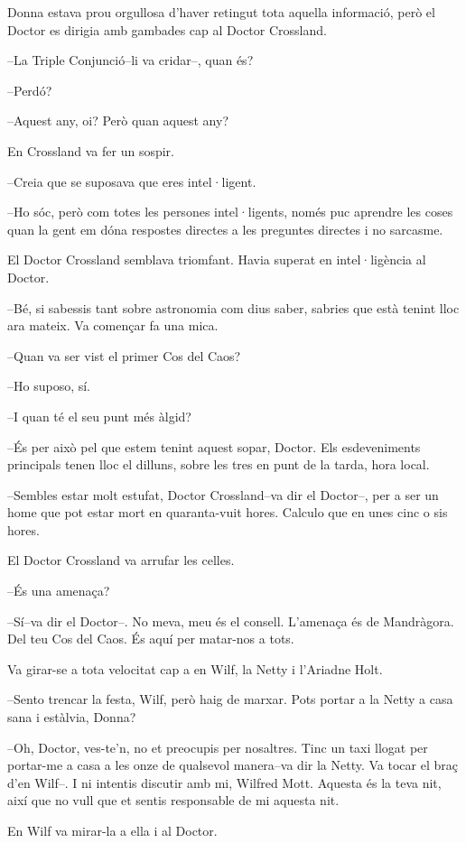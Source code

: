 Donna estava prou orgullosa d'haver retingut tota aquella informació,
però el Doctor es dirigia amb gambades cap al Doctor Crossland.

--La Triple Conjunció--li va cridar--, quan és?

--Perdó?

--Aquest any, oi? Però quan aquest any?

En Crossland va fer un sospir.

--Creia que se suposava que eres intel·ligent.

--Ho sóc, però com totes les persones intel·ligents, només puc aprendre
les coses quan la gent em dóna respostes directes a les preguntes
directes i no sarcasme.

El Doctor Crossland semblava triomfant. Havia superat en intel·ligència
al Doctor.

--Bé, si sabessis tant sobre astronomia com dius saber, sabries que està
tenint lloc ara mateix. Va començar fa una mica.

--Quan va ser vist el primer Cos del Caos? ~

--Ho suposo, sí.

--I quan té el seu punt més àlgid?

--És per això pel que estem tenint aquest sopar, Doctor. Els
esdeveniments principals tenen lloc el dilluns, sobre les tres en punt
de la tarda, hora local.

--Sembles estar molt estufat, Doctor Crossland--va dir el Doctor--, per
a ser un home que pot estar mort en quaranta-vuit hores. Calculo que en
unes cinc o sis hores.

El Doctor Crossland va arrufar les celles.

--És una amenaça?

--Sí--va dir el Doctor--. No meva, meu és el consell. L'amenaça és de
Mandràgora. Del teu Cos del Caos. És aquí per matar-nos a tots.

Va girar-se a tota velocitat cap a en Wilf, la Netty i l'Ariadne Holt.

--Sento trencar la festa, Wilf, però haig de marxar. Pots portar a la
Netty a casa sana i estàlvia, Donna?

--Oh, Doctor, ves-te'n, no et preocupis per nosaltres. Tinc un taxi
llogat per portar-me a casa a les onze de qualsevol manera--va dir la
Netty. Va tocar el braç d'en Wilf--. I ni intentis discutir amb mi,
Wilfred Mott. Aquesta és la teva nit, així que no vull que et sentis
responsable de mi aquesta nit.

En Wilf va mirar-la a ella i al Doctor.


